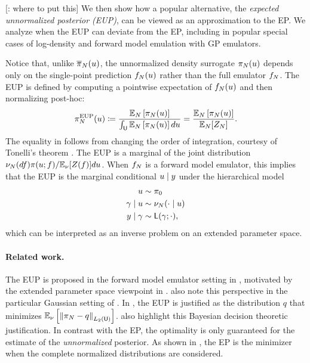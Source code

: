 \documentclass[12pt]{article}
\begin{document}
[\todo: where to put this] We then show how a popular alternative,
the \textit{expected unnormalized posterior (EUP)}, can be viewed as an 
approximation to the EP. We analyze when the EUP can deviate from the EP,
including in popular special cases of log-density and forward model emulation
with GP emulators.

Notice that, unlike $\overline{\pi}_{N}(u)$, the unnormalized density surrogate
$\pi_{N}(u)$ depends only on the single-point prediction $f_{N}(u)$
rather than the full emulator $f_{N}$. The EUP is defined by computing
a pointwise expectation of $f_{N}(u)$ and then normalizing post-hoc:
\begin{equation}
\pi_{N}^{\mathrm{EUP}}(u) \coloneqq 
\frac{\mathbb{E}_{N}\left[\pi_{N}(u) \right]}{\int_{\mathsf{U}} \mathbb{E}_{N}\left[\pi_{N}(u) \right] du}
= \frac{\mathbb{E}_{N}\left[\pi_{N}(u) \right]}{\mathbb{E}_{N}[Z_{N}]}. \label{eq:post-approx-EL} 
\end{equation}
The equality in  follows from
changing the order of integration, courtesy of Tonelli's theorem \citep{StuartTeck1}. The EUP
is a marginal of the joint distribution 
$\nu_{N}(df) \pi(u; f) / \mathbb{E}_{\nu_{}}[Z(f)] du$. 
When $f_{N}$ is a forward model emulator, this implies that the EUP is the 
marginal conditional $u \mid y$ under the hierarchical model 
\begin{align}
u &\sim \pi_0 \label{eq:el-prob-model} \\
\gamma \mid u &\sim \nu_{N}(\cdot \mid u) \nonumber \\
y \mid \gamma &\sim \mathsf{L}(\gamma; \cdot), \nonumber
\end{align}
which can be interpreted as an inverse problem on an extended parameter space.

\paragraph{Related work.} The EUP is proposed in the forward model emulator setting 
in \citet{BilionisBayesSurrogates}, motivated by the extended parameter space viewpoint
in . \citet{StuartTeck2,CES} also note this perspective
in the particular Gaussian setting of .
In \citet{SinsbeckNowak}, the EUP is justified as the distribution 
$q$ that minimizes $\mathbb{E}_{\nu_{}}\left[\left\lVert\pi_{N} - q\right\rVert_{L_2(\mathsf{U})} \right]$.
\citet{StuartTeck1,StuartTeck2,VehtariParallelGP} also highlight this Bayesian 
decision theoretic justification. 
In contrast with the EP, the optimality is only guaranteed for the estimate of the 
\textit{unnormalized} posterior.
As shown in , the EP is the minimizer when the complete 
normalized distributions are considered.
\end{document}
